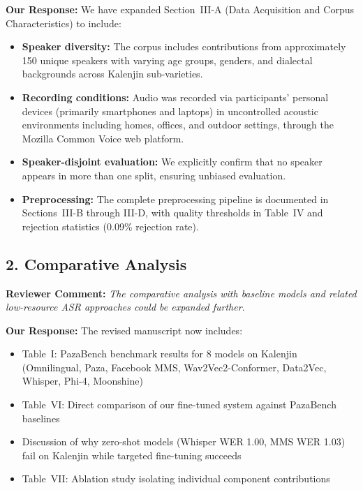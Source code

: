 \documentclass[11pt]{article}
\newcommand{\reviewercomment}[1]{\textcolor{reviewercolor}{\textbf{Reviewer Comment:} \textit{#1}}}
\newcommand{\response}[1]{\textcolor{responsecolor}{\textbf{Our Response:} #1}}
\begin{document}
\response{We have expanded Section~III-A (Data Acquisition and Corpus Characteristics) to include:}
\begin{itemize}[noitemsep]
    \item \textbf{Speaker diversity:} The corpus includes contributions from approximately 150 unique speakers with varying age groups, genders, and dialectal backgrounds across Kalenjin sub-varieties.
    \item \textbf{Recording conditions:} Audio was recorded via participants' personal devices (primarily smartphones and laptops) in uncontrolled acoustic environments including homes, offices, and outdoor settings, through the Mozilla Common Voice web platform.
    \item \textbf{Speaker-disjoint evaluation:} We explicitly confirm that no speaker appears in more than one split, ensuring unbiased evaluation.
    \item \textbf{Preprocessing:} The complete preprocessing pipeline is documented in Sections~III-B through III-D, with quality thresholds in Table~IV and rejection statistics (0.09\% rejection rate).
\end{itemize}

\vspace{1em}

\subsection*{2. Comparative Analysis}

\reviewercomment{The comparative analysis with baseline models and related low-resource ASR approaches could be expanded further.}

\response{The revised manuscript now includes:}
\begin{itemize}[noitemsep]
    \item Table~I: PazaBench benchmark results for 8 models on Kalenjin (Omnilingual, Paza, Facebook MMS, Wav2Vec2-Conformer, Data2Vec, Whisper, Phi-4, Moonshine)
    \item Table~VI: Direct comparison of our fine-tuned system against PazaBench baselines
    \item Discussion of why zero-shot models (Whisper WER 1.00, MMS WER 1.03) fail on Kalenjin while targeted fine-tuning succeeds
    \item Table~VII: Ablation study isolating individual component contributions
\end{itemize}

\vspace{1em}
\end{document}
